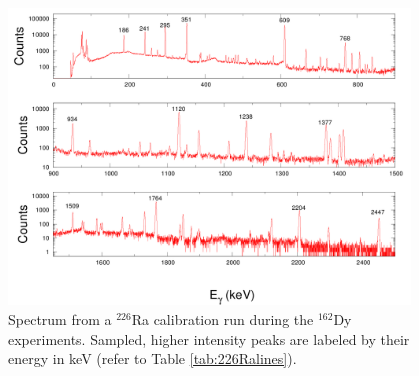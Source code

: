 \begin{figure}[ht]
\begin{center}
\includegraphics[width=0.95\textwidth]{figures/calibration_226Ra.png}
\end{center}
\caption{Spectrum from a $^{226}$Ra calibration run during the $^{162}$Dy experiments. Sampled, higher intensity peaks are labeled by their energy in keV (refer to Table \ref{tab:226Ralines}).\label{fig:226Ra_spectrum}}
\end{figure}

